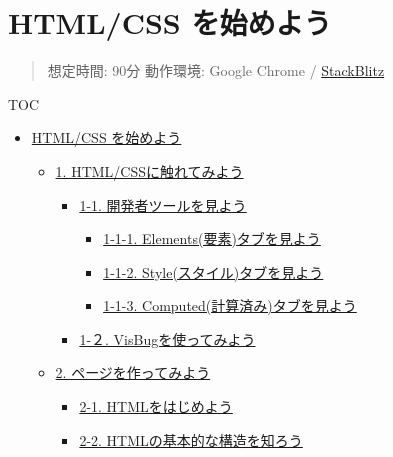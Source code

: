 \section{HTML/CSS
を始めよう}\label{htmlcss-ux3092ux59cbux3081ux3088ux3046}

\begin{quote}
想定時間: 90分 動作環境: Google Chrome /
\href{https://stackblitz.com}{StackBlitz}
\end{quote}

TOC

\begin{itemize}
\tightlist
\item
  \hyperref[htmlcss-ux3092ux59cbux3081ux3088ux3046]{HTML/CSS を始めよう}

  \begin{itemize}
  \tightlist
  \item
    \hyperref[1-htmlcssux306bux89e6ux308cux3066ux307fux3088ux3046]{1.
    HTML/CSSに触れてみよう}

    \begin{itemize}
    \tightlist
    \item
      \hyperref[1-1-ux958bux767aux8005ux30c4ux30fcux30ebux3092ux898bux3088ux3046]{1-1.
      開発者ツールを見よう}

      \begin{itemize}
      \tightlist
      \item
        \hyperref[1-1-1-elementsux8981ux7d20ux30bfux30d6ux3092ux898bux3088ux3046]{1-1-1.
        Elements(要素)タブを見よう}
      \item
        \hyperref[1-1-2-styleux30b9ux30bfux30a4ux30ebux30bfux30d6ux3092ux898bux3088ux3046]{1-1-2.
        Style(スタイル)タブを見よう}
      \item
        \hyperref[1-1-3-computedux8a08ux7b97ux6e08ux307fux30bfux30d6ux3092ux898bux3088ux3046]{1-1-3.
        Computed(計算済み)タブを見よう}
      \end{itemize}
    \item
      \hyperref[1-uxff12-visbugux3092ux4f7fux3063ux3066ux307fux3088ux3046]{1-２.
      VisBugを使ってみよう}
    \end{itemize}
  \item
    \hyperref[2-ux30daux30fcux30b8ux3092ux4f5cux3063ux3066ux307fux3088ux3046]{2.
    ページを作ってみよう}

    \begin{itemize}
    \tightlist
    \item
      \hyperref[2-1-htmlux3092ux306fux3058ux3081ux3088ux3046]{2-1.
      HTMLをはじめよう}
    \item
      \hyperref[2-2-htmlux306eux57faux672cux7684ux306aux69cbux9020ux3092ux77e5ux308dux3046]{2-2.
      HTMLの基本的な構造を知ろう}


\end{itemize}
\end{itemize}
\end{itemize}
